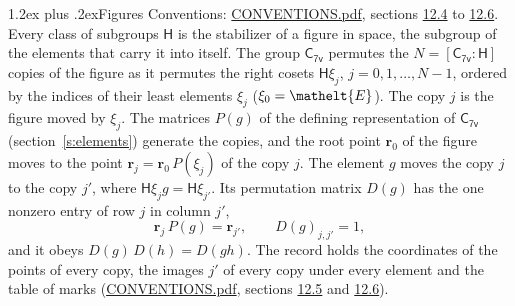 \documentclass[10pt,a4paper]{article}
\makeatletter
\renewcommand\section{\@startsection{section}{1}{\z@}{-3ex plus -1ex minus -.2ex}%
  {1.2ex plus .2ex}{\normalfont\large\sffamily\bfseries\color{parttitle}}}
\numberwithin{equation}{section}
\newcommand{\eltfont}[1]{{\let\sigma\eltsigma\mathelt{#1}}}
\newcommand{\grp}[1]{\mathsf{#1}}
\newcommand{\cls}[1]{\eltfont{#1}}
\newcommand{\pointr}{\mathbf{r}}
\makeatother
\begin{document}
\section{Figures}\label{s:permutation}
Conventions: \href{../../CONVENTIONS.pdf}{CONVENTIONS.pdf}, sections \href{../../CONVENTIONS.pdf\#conv.12.4}{12.4} to \href{../../CONVENTIONS.pdf\#conv.12.6}{12.6}.
Every class of subgroups $\grp{H}$ is the stabilizer of a figure in space, the subgroup of the elements that carry it into itself. \label{n:local.orbit.size}\label{n:element.coset.least}\label{n:index.coset}The group $\grp{C_{7v}}$ permutes the $N = [\grp{C_{7v}} : \grp{H}]$ copies of the figure as it permutes the right cosets $\grp{H}\xi_j$, $j = 0, 1, \dots, N - 1$, ordered by the indices of their least elements $\xi_j$ ($\xi_0 = \cls{E}$). The copy $j$ is the figure moved by $\xi_j$. The matrices $P(g)$ of the defining representation of $\grp{C_{7v}}$ (section~\ref{s:elements}) generate the copies, and the root point $\pointr_0$ of the figure moves to the point $\pointr_j = \pointr_0\, P(\xi_j)$ of the copy $j$. \label{n:local.coset.image}The element $g$ moves the copy $j$ to the copy $j'$, where $\grp{H}\xi_j g = \grp{H}\xi_{j'}$. \label{n:local.matrix.permutation}Its permutation matrix $D(g)$ has the one nonzero entry of row $j$ in column $j'$,
\begin{equation}\label{e:perm.matrix}\pointr_j\, P(g) = \pointr_{j'}, \qquad D(g)_{j,j'} = 1,\end{equation}
and it obeys $D(g)\, D(h) = D(gh)$. The record holds the coordinates of the points of every copy, the images $j'$ of every copy under every element and the table of marks (\href{../../CONVENTIONS.pdf}{CONVENTIONS.pdf}, sections \href{../../CONVENTIONS.pdf\#conv.12.5}{12.5} and \href{../../CONVENTIONS.pdf\#conv.12.6}{12.6}).
\end{document}
